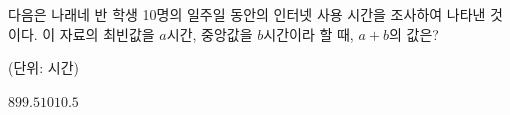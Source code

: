 다음은 나래네 반 학생 10명의 일주일 동안의 인터넷 사용 시간을 조사하여 나타낸 것이다. 이 자료의 최빈값을 $a$시간, 중앙값을 $b$시간이라 할 때, $a+b$의 값은?\par\noindent\hfill{\footnotesize (단위: 시간)}
\begin{choices32}{$8$}{$9$}{$9.5$}{$10$}{$10.5$}\end{choices32}
